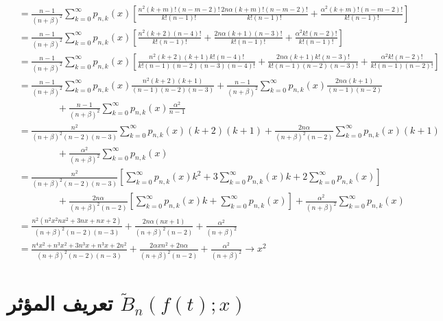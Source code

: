 \begin{align*}
	&= \frac{n-1}{(n+\beta)^2} \sum_{k=0}^{\infty}p_{n, k}(x) \left[\textstyle
	\frac{n^2 (k+m)! (n-m-2)!}{k!(n-1)!} 
	\frac{2n \alpha(k+m)!(n-m-2)!}{k!(n-1)!} + \frac{\alpha^2 (k+m)!(n-m-2)!}{k!(n-1)!}\right]\\
	&= \frac{n-1}{(n+\beta)^2} \sum_{k=0}^{\infty}p_{n, k}(x) \left[\textstyle
	\frac{n^2(k+2)(n-4)!}{k!(n-1)!} + \frac{2n\alpha(k+1)(n-3)!}{k!(n-1)!} + \frac{\alpha^2 k!(n-2)!}{k!(n-1)!}
	\right]\\
	&= \frac{n-1}{(n+\beta)^2} \sum_{k=0}^{\infty}p_{n, k}(x) \left[\textstyle
	\frac{n^2(k+2)(k+1)k!(n-4)!}{k!(n-1)(n-2)(n-3)(n-4)!} + \frac{2n\alpha (k+1)k!(n-3)!}{k!(n-1)(n-2)(n-3)!}+
	\frac{\alpha^2 k!(n-2)!}{k!(n-1)(n-2)!}
	\right]\\
	&= \frac{n-1}{(n+\beta)^2} \sum_{k=0}^{\infty}p_{n, k}(x)  {\textstyle\frac{n^2(k+2)(k+1)}{(n-1)(n-2)(n-3)}} +  \frac{n-1}{(n+\beta)^2} \sum_{k=0}^{\infty}p_{n, k}(x) {\textstyle\frac{2n\alpha (k+1)}{(n-1)(n-2)}}\\
	&\qquad\qquad + \frac{n-1}{(n+\beta)^2} \sum_{k=0}^{\infty}p_{n, k}(x) {\textstyle\frac{\alpha^2}{n-1}}\\
	&= {\textstyle \frac{n^2}{(n+\beta)^2(n-2)(n-3)}}\sum_{k=0}^{\infty} p_{n,k}(x)(k+2)(k+1) + {\textstyle \frac{2n\alpha}{(n+\beta)^2(n-2)}} \sum_{k=0}^{\infty} p_{n,k}(x) (k+1)\\
	&\qquad\qquad + {\textstyle\frac{\alpha^2}{(n+\beta)^2}} \sum_{k=0}^{\infty} p_{n,k}(x)\\
	&= {\textstyle \frac{n^2}{(n+\beta)^2(n-2)(n-3)}} \left[
	\sum_{k=0}^{\infty}p_{n,k}(x) k^2 + 3 \sum_{k=0}^{\infty}p_{n,k}(x) k + 2 \sum_{k=0}^{\infty}p_{n,k}(x)
	\right]\\
	&\qquad\qquad + {\textstyle \frac{2n\alpha}{(n+\beta)^2(n-2)}} \left[
	\sum_{k=0}^{\infty}p_{n,k}(x)  k + \sum_{k=0}^{\infty}p_{n,k}(x) 
	\right]
	+  {\textstyle\frac{\alpha^2}{(n+\beta)^2}} \sum_{k=0}^{\infty} p_{n,k}(x)\\
	& = \frac{n^2(n^2x^2nx^2+3nx +nx+2)}{(n+\beta)^2(n-2)(n-3)} + \frac{2n\alpha(nx+1)}{(n+\beta)^2(n-2)} + \frac{\alpha^2}{(n+\beta)^2}\\
	& = \frac{n^4x^2+n^3x^2+3n^3x +n^3x+2n^2}{(n+\beta)^2(n-2)(n-3)} + \frac{2 \alpha x n^2+2n\alpha}{(n+\beta)^2(n-2)} + \frac{\alpha^2}{(n+\beta)^2} \to x^2 
\end{align*}

\newcommand{\tB}{\tilde{B}}
\section{تعريف المؤثر $\tB_n(f(t); x)$}

